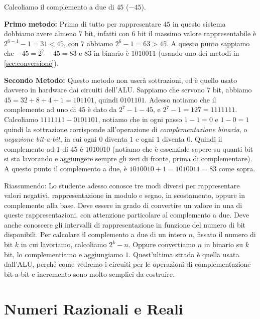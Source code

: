 \begin{ex} Calcoliamo il complemento a due di $45$ ($-45$). 
	
\noindent \textbf{Primo metodo:} 	
Prima di tutto per rappresentare $45$ in questo sistema dobbiamo avere almeno $7$ bit, infatti con $6$ bit il massimo valore rappresentabile è $2^{6-1}-1 = 31 < 45$, con $7$ abbiamo $2^6-1 = 63>45$. A questo punto sappiamo che $-45 = 2^7-45 = 83$ e $83$ in binario è $1010011$ (usando uno dei metodi in \ref{sec:conversione}).\medskip

\noindent \textbf{Secondo Metodo:}
Questo metodo non userà sottrazioni, ed è quello usato davvero in hardware dai circuiti dell'ALU. Sappiamo che servono $7$ bit, abbiamo $45 = 32+8+4+1 = 101101$, quindi $0101101$. 
Adesso notiamo che il complemento ad uno di
$45$ è dato da $2^7-1-45$, e $2^7-1 = 127 = 1111111$. Calcoliamo $1111111-0101101$, notiamo che in ogni passo $1-1=0$ e $1-0=1$ quindi la sottrazione corrisponde all'operazione di \emph{complementazione binaria}, o
\emph{negazione bit-a-bit}, in cui ogni $0$ diventa $1$ e ogni $1$ diventa $0$.
Quindi il complemento ad $1$ di $45$ è $1010010$ (notiamo che è essenziale sapere su quanti bit si sta lavorando e aggiungere sempre gli zeri di fronte, prima di complementare). A questo punto il complemento a due, è $1010010+1 = 1010011 = 83$ come sopra.
\end{ex}

Riassumendo: Lo studente adesso conosce tre modi diversi per rappresentare valori negativi, rappresentazione in modulo e segno, in scostamento, oppure in complemento alla base. Deve essere in grado di convertire un valore in una di queste rappresentazioni, con attenzione particolare al complemento a due. 
Deve anche conoscere gli intervalli di rappresentazione in funzione del numero di bit disponibili. Per calcolare il complemento a due di un intero $n$, fissato il numero di bit $k$ in cui lavoriamo, calcoliamo $2^k-n$. Oppure
convertiamo $n$ in binario su $k$ bit, lo complementiamo e aggiungiamo $1$.
Quest'ultima strada è quella usata dall'ALU, perché come vedremo i circuiti
per le operazioni di complementazione bit-a-bit e incremento sono molto semplici da costruire.

\section{Numeri Razionali e Reali}

